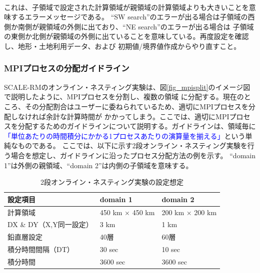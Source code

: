 \\

\noindent これは、子領域で設定された計算領域が親領域の計算領域よりも大きいことを意味するエラーメッセージである。
``SW search''のエラーが出る場合は子領域の西側か南側が親領域の外側に出ており、``NE search''のエラーが出る場合は
子領域の東側か北側が親領域の外側に出ていることを意味している。再度設定を確認し、地形・土地利用データ、および
初期値/境界値作成からやり直すこと。


\subsubsection{MPIプロセスの分配ガイドライン}
SCALE-RMのオンライン・ネスティング実験は、図\ref{fig_mpisplit}のイメージ図で説明したように、MPIプロセスを分割し、複数の領域
に分配する。現在のところ、その分配割合はユーザーに委ねられているため、適切にMPIプロセスを分配しなければ余計な計算時間が
かかってしまう。ここでは、適切にMPIプロセスを分配するためのガイドラインについて説明する。ガイドラインは、領域毎に
\textcolor{blue}{「単位あたりの時間積分にかかる1プロセスあたりの演算量を揃える」}という単純なものである。
ここでは、以下に示す2段オンライン・ネスティング実験を行う場合を想定し、ガイドラインに沿ったプロセス分配方法の例を示す。
``domain 1''は外側の親領域、``domain 2''は内側の子領域を意味する。

\begin{table}[htb]
\begin{center}
\caption{2段オンライン・ネスティング実験の設定想定}
\begin{tabularx}{150mm}{|l|l|X|} \hline
 \rowcolor[gray]{0.9} 設定項目 & domain 1 & domain 2 \\ \hline
 計算領域 & 450 km $\times$ 450 km & 200 km $\times$ 200 km \\ \hline
 DX \& DY（X,Y同一設定） & 3 km & 1 km \\ \hline
 鉛直層設定 & 40層 & 60層 \\ \hline
 積分時間間隔（DT）& 30 sec & 10 sec \\ \hline
 積分時間 & 3600 sec & 3600 sec \\ \hline
\end{tabularx}
\label{tab:nest_proc_guide1}
\end{center}
\end{table}

